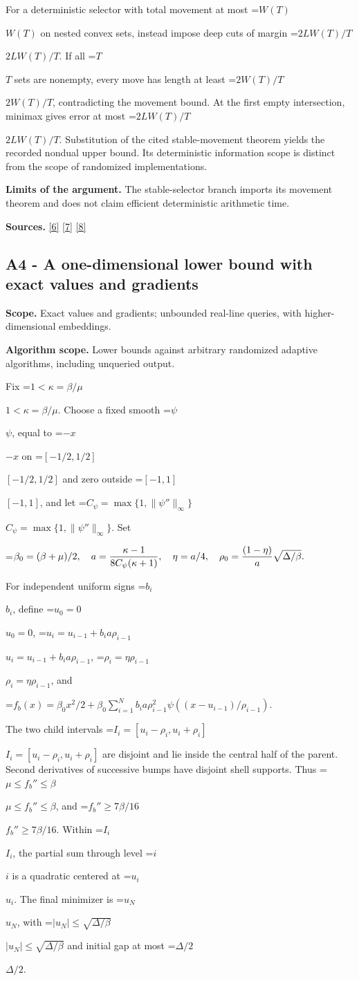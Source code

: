 \documentclass[10pt,a4paper]{article}
\newcommand{\AtlasMath}[1]{\par\begingroup\centering\setbox0=\hbox{$\displaystyle #1$}\ifdim\wd0>1.4\linewidth\typeout{ATLAS WIDE FORMULA: \the\wd0}\fi\ifdim\wd0>\linewidth\resizebox{\linewidth}{!}{\box0}\else\box0\fi\par\endgroup}
\newcommand{\AtlasInlineMath}[1]{\begingroup\setbox0=\hbox{$#1$}\ifdim\wd0>.4\linewidth\endgroup\AtlasMath{#1}\else\endgroup$#1$\fi}
\begin{document}
For a deterministic selector with total movement at most \AtlasInlineMath{W(T)} on nested convex sets, instead impose deep cuts of margin \AtlasInlineMath{2LW(T)/T}. If all \AtlasInlineMath{T} sets are nonempty, every move has length at least \AtlasInlineMath{2W(T)/T}, contradicting the movement bound. At the first empty intersection, minimax gives error at most \AtlasInlineMath{2LW(T)/T}. Substitution of the cited stable-movement theorem yields the recorded nondual upper bound. Its deterministic information scope is distinct from the scope of randomized implementations.

\textbf{Limits of the argument.} The stable-selector branch imports its movement theorem and does not claim efficient deterministic arithmetic time.

\textbf{Sources.} \href{https://arxiv.org/pdf/1405.4980}{[6]} \href{https://www2.isye.gatech.edu/~nemirovs/MOR_AccuracyCertificates.pdf}{[7]} \href{https://arxiv.org/pdf/2609.20701}{[8]}

\subsection{A4 - A one-dimensional lower bound with exact values and gradients}
\textbf{Scope.} Exact values and gradients; unbounded real-line queries, with higher-dimensional embeddings.

\textbf{Algorithm scope.} Lower bounds against arbitrary randomized adaptive algorithms, including unqueried output.

Fix \AtlasInlineMath{1<\kappa=\beta/\mu}. Choose a fixed smooth \AtlasInlineMath{\psi}, equal to \AtlasInlineMath{-x} on \AtlasInlineMath{[-1/2,1/2]} and zero outside \AtlasInlineMath{[-1,1]}, and let \AtlasInlineMath{C_\psi=\max\{1,\|\psi''\|_\infty\}}. Set

\AtlasMath{\beta_0=(\beta+\mu)/2,\quad a={\kappa-1\over8C_\psi(\kappa+1)},\quad
\eta=a/4,\quad \rho_0={(1-\eta)\over a}\sqrt{\Delta/\beta}.}

For independent uniform signs \AtlasInlineMath{b_i}, define \AtlasInlineMath{u_0=0},
\AtlasInlineMath{u_i=u_{i-1}+b_i a\rho_{i-1}}, \AtlasInlineMath{\rho_i=\eta\rho_{i-1}}, and

\AtlasMath{f_b(x)=\beta_0x^2/2+
\beta_0\sum_{i=1}^N b_i a\rho_{i-1}^2
\psi((x-u_{i-1})/\rho_{i-1}).}

The two child intervals \AtlasInlineMath{I_i=[u_i-\rho_i,u_i+\rho_i]} are disjoint and lie inside the central half of the parent. Second derivatives of successive bumps have disjoint shell supports. Thus \AtlasInlineMath{\mu\le f_b''\le\beta}, and \AtlasInlineMath{f_b''\ge7\beta/16}. Within \AtlasInlineMath{I_i}, the partial sum through level \AtlasInlineMath{i} is a quadratic centered at \AtlasInlineMath{u_i}. The final minimizer is \AtlasInlineMath{u_N}, with \AtlasInlineMath{|u_N|\le\sqrt{\Delta/\beta}} and initial gap at most \AtlasInlineMath{\Delta/2}.
\end{document}
